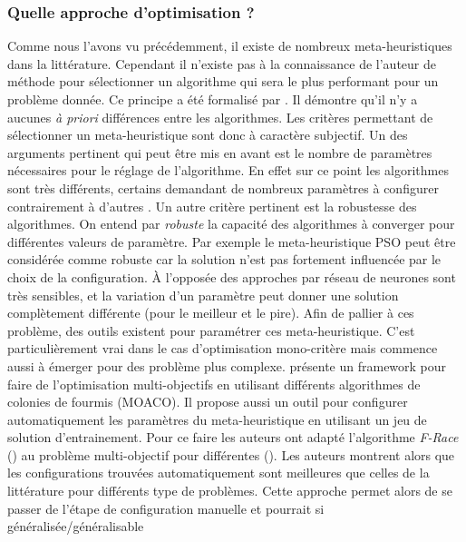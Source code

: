 \subsubsection{Quelle approche d’optimisation ?} %
\label{ssub:quelle_approche_d_optimisation_}
Comme nous l’avons vu précédemment, il existe de nombreux meta-heuristiques dans
la littérature. Cependant il n’existe pas à la connaissance de l’auteur de méthode
pour sélectionner un algorithme qui sera le plus performant pour un problème donnée.
Ce principe a été formalisé par \cite{Wolpert199767} . Il démontre qu’il
n’y a aucunes \emph{à priori} différences entre les algorithmes. Les critères
permettant de sélectionner un meta-heuristique sont donc à caractère subjectif.
Un des arguments pertinent qui peut être mis en avant est le nombre de paramètres
nécessaires pour le réglage de l’algorithme. En effet sur ce point les algorithmes
sont très différents, certains demandant de nombreux paramètres à configurer
 contrairement
à d’autres . Un autre critère pertinent
est la robustesse des algorithmes. On entend par \emph{robuste} la capacité des algorithmes
à converger pour différentes valeurs de paramètre. Par exemple le meta-heuristique PSO
peut être considérée comme robuste  car la solution n’est
pas fortement influencée par le choix de la configuration.
À l’opposée des approches par réseau de neurones  sont
très sensibles, et la variation d’un paramètre peut donner une solution complètement
différente (pour le meilleur et le pire).
Afin de pallier à ces problème, des outils existent pour paramétrer ces meta-heuristique.
C’est particulièrement vrai dans le cas d’optimisation mono-critère mais commence
aussi à émerger pour des problème plus complexe. \cite{Lopez-Ibanez2012861}
présente un framework pour faire de l’optimisation multi-objectifs en utilisant
différents algorithmes de colonies de fourmis (MOACO). Il propose aussi un outil
pour configurer automatiquement les paramètres du meta-heuristique en utilisant un jeu de solution
d’entrainement. Pour ce faire les auteurs ont adapté l’algorithme \emph{F-Race} (\cite{Lopez-Ibanez2011})
au problème multi-objectif pour différentes (\cite{Birattari2010311,Zitzler2003117}). Les auteurs montrent
alors que les configurations trouvées automatiquement sont meilleures que celles
de la littérature pour différents type de problèmes. Cette approche permet alors
de se passer de l’étape de configuration manuelle et pourrait si généralisée/généralisable
